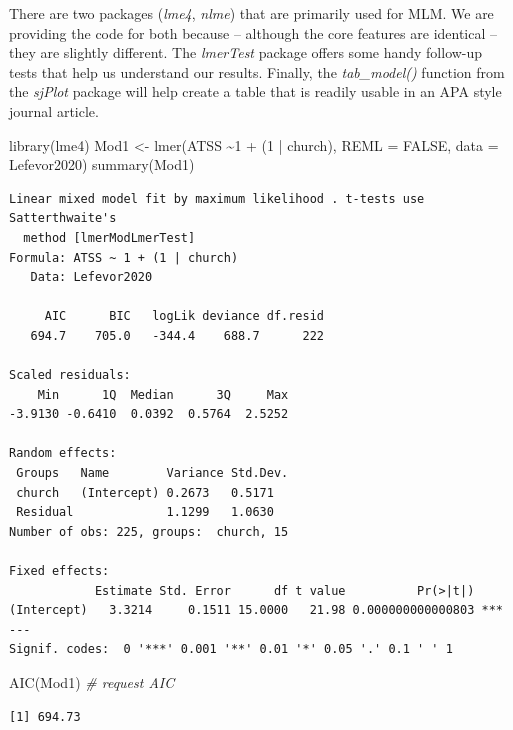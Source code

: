 \documentclass[
  english,
]{book}
\newenvironment{Shaded}{\begin{snugshade}}{\end{snugshade}}
\newcommand{\AttributeTok}[1]{\textcolor[rgb]{0.77,0.63,0.00}{#1}}
\newcommand{\CommentTok}[1]{\textcolor[rgb]{0.56,0.35,0.01}{\textit{#1}}}
\newcommand{\ConstantTok}[1]{\textcolor[rgb]{0.00,0.00,0.00}{#1}}
\newcommand{\DecValTok}[1]{\textcolor[rgb]{0.00,0.00,0.81}{#1}}
\newcommand{\FunctionTok}[1]{\textcolor[rgb]{0.00,0.00,0.00}{#1}}
\newcommand{\NormalTok}[1]{#1}
\newcommand{\OtherTok}[1]{\textcolor[rgb]{0.56,0.35,0.01}{#1}}
\newcommand{\SpecialCharTok}[1]{\textcolor[rgb]{0.00,0.00,0.00}{#1}}
\begin{document}
There are two packages (\emph{lme4}, \emph{nlme}) that are primarily used for MLM. We are providing the code for both because -- although the core features are identical -- they are slightly different. The \emph{lmerTest} package offers some handy follow-up tests that help us understand our results. Finally, the \emph{tab\_model()} function from the \emph{sjPlot} package will help create a table that is readily usable in an APA style journal article.

\begin{Shaded}
\begin{Highlighting}[]
\FunctionTok{library}\NormalTok{(lme4)}
\NormalTok{Mod1 }\OtherTok{\textless{}{-}} \FunctionTok{lmer}\NormalTok{(ATSS }\SpecialCharTok{\textasciitilde{}}\DecValTok{1} \SpecialCharTok{+}\NormalTok{ (}\DecValTok{1} \SpecialCharTok{|}\NormalTok{ church), }\AttributeTok{REML =} \ConstantTok{FALSE}\NormalTok{, }\AttributeTok{data =}\NormalTok{ Lefevor2020)}
\FunctionTok{summary}\NormalTok{(Mod1)}
\end{Highlighting}
\end{Shaded}

\begin{verbatim}
Linear mixed model fit by maximum likelihood . t-tests use Satterthwaite's
  method [lmerModLmerTest]
Formula: ATSS ~ 1 + (1 | church)
   Data: Lefevor2020

     AIC      BIC   logLik deviance df.resid 
   694.7    705.0   -344.4    688.7      222 

Scaled residuals: 
    Min      1Q  Median      3Q     Max 
-3.9130 -0.6410  0.0392  0.5764  2.5252 

Random effects:
 Groups   Name        Variance Std.Dev.
 church   (Intercept) 0.2673   0.5171  
 Residual             1.1299   1.0630  
Number of obs: 225, groups:  church, 15

Fixed effects:
            Estimate Std. Error      df t value          Pr(>|t|)    
(Intercept)   3.3214     0.1511 15.0000   21.98 0.000000000000803 ***
---
Signif. codes:  0 '***' 0.001 '**' 0.01 '*' 0.05 '.' 0.1 ' ' 1
\end{verbatim}

\begin{Shaded}
\begin{Highlighting}[]
\FunctionTok{AIC}\NormalTok{(Mod1) }\CommentTok{\# request AIC}
\end{Highlighting}
\end{Shaded}

\begin{verbatim}
[1] 694.73
\end{verbatim}
\end{document}
